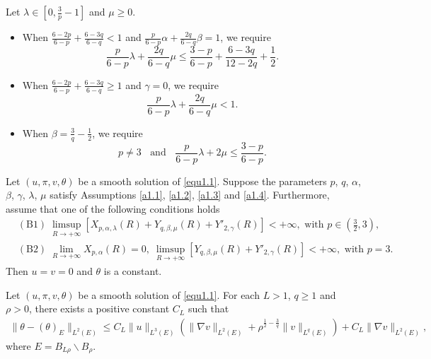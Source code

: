 \documentclass[10pt,a4paper]{amsart}
\begin{document}
\begin{Assum}\label{a1.3}
Let $\lambda\in\left[0,\frac{3}{p}-1\right]$ and $\mu\geq0$.
\end{Assum}

\begin{Assum}\label{a1.4}
\begin{itemize}
\item[(i)]
When $\frac{6-2p}{6-p} + \frac{6-3q}{6-q} < 1$ and $\frac{p}{6-p}\alpha+\frac{2q}{6-q}\beta=1$, we require
$$
\frac{p}{6-p}\lambda+\frac{2q}{6-q}\mu\leq \frac{3-p}{6-p}+\frac{6-3q}{12-2q}+\frac{1}{2}.
$$	
\item[(ii)] When $\frac{6-2p}{6-p} + \frac{6-3q}{6-q} \geq 1$ and $\gamma=0$,
we require
$$
\frac{p}{6-p}\lambda+\frac{2q}{6-q}\mu<1.
$$	
\item[(iii)] When $\beta=\frac{3}{q}-\frac{1}{2}$, we require
$$
p\neq3\;\;\text{ and }\;\;\frac{p}{6-p}\lambda+2\mu\leq \frac{3-p}{6-p}.
$$
\end{itemize}	
\end{Assum}

\begin{Thm}\label{main2}
Let $(u,\pi,v,\theta)$ be a smooth solution of \eqref{equ1.1}. Suppose the parameters $p$, $q$, $\alpha$, $\beta$, $\gamma$, $\lambda$, $\mu$ satisfy Assumptions \ref{a1.1}, \ref{a1.2}, \ref{a1.3} and \ref{a1.4}.
Furthermore, assume that one of the following conditions holds
\begin{align*}
&\mathrm{(B1)}\;\limsup\limits_{R\rightarrow+\infty}\left[X_{p,\alpha,\lambda}(R)+Y_{q,\beta,\mu}(R)+Y'_{2,\gamma}(R)\right]<+\infty,\text{ with }p\in\left(\frac{3}{2},3\right),\\
&\mathrm{(B2)}\;\lim\limits_{R\rightarrow+\infty}X_{p,\alpha}(R)=0,\;\limsup\limits_{R\rightarrow+\infty}\left[Y_{q,\beta,\mu}(R)+Y'_{2,\gamma}(R)\right]<+\infty,\text{ with }p=3.
\end{align*}
Then $u=v=0$ and $\theta$ is a constant.
\end{Thm}

\begin{Lem}\label{Lem2.5}
Let $(u,\pi,v,\theta)$ be a smooth solution of \eqref{equ1.1}. For each $L>1$, $q\geq1$ and $\rho>0$, there exists a positive constant $C_L$  such that
\begin{align}\label{ine2.1}
\|\theta - (\theta)_{E}\|_{L^2(E)} \leq C_L \|u\|_{L^3(E)} \left( \|\nabla v\|_{L^2(E)} + \rho^{\frac{1}{2}-\frac{3}{q}} \|v\|_{L^q(E)} \right) + C_L\|\nabla v\|_{L^2(E)},
\end{align}
where $E= B_{L\rho}\backslash B_\rho$.
\end{Lem}
\end{document}

